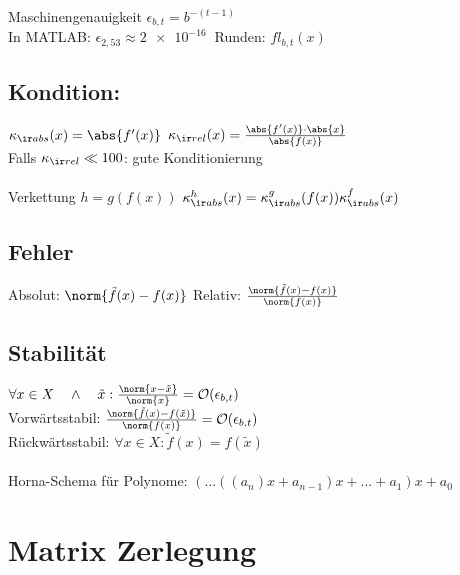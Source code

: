 \documentclass[fs, footer]{latex4ei}
\begin{document}
\begin{sectionbox}
\begin{sectionbox}
\begin{sectionbox}
	Maschinengenauigkeit $\epsilon_{b,t} = b^{-(t-1)}$\\
	In MATLAB: $\epsilon_{2,53} \approx \SI{2e-16}{}$ \qquad Runden: $fl_{b,t}(x)$\\
\end{sectionbox}

\begin{sectionbox}
	\subsection{Kondition:}
	$\kappa_{\ir abs}(x) = \abs{f'(x)}$ \qquad\qquad $\kappa_{\ir rel}(x) = \frac{\abs{f'(x)} \cdot \abs{x}}{\abs{f(x)}}$\\
	Falls $\kappa_{\ir rel} \ll 100$: gute Konditionierung\\
	\\
	Verkettung $h = g(f(x))$ \quad $\kappa^h_{\ir abs}(x) = \kappa^g_{\ir abs}(f(x))\kappa^f_{\ir abs}(x)$\\
\end{sectionbox}

\begin{sectionbox}
	\subsection{Fehler}
	Absolut: $\norm{\tilde f(x) - f(x)}$ \qquad\qquad Relativ: $\frac{\norm{\tilde f(x) - f(x)}}{\norm{f(x)}}$
\end{sectionbox}

\begin{sectionbox}
	\subsection{Stabilität}
	$\forall x \in X \quad \land \quad \tilde x:\frac{\norm{x-\tilde x}}{\norm{x}} = \mathcal O(\epsilon_{b,t})$\\
	Vorwärtsstabil:  $\frac{\norm{\tilde f(x) - f(\tilde x)}}{\norm{f(x)}} = \mathcal{O}(\epsilon_{b,t})$\\
	Rückwärtsstabil: $\forall x \in X:\tilde f(x) = f(\tilde x)$\\
	\\
	Horna-Schema für Polynome: $(...((a_n) x + a_{n-1})x + ... +a_{1})x + a_0$\\
\end{sectionbox}	

\section{Matrix Zerlegung}
\begin{sectionbox}

\end{sectionbox}
\end{sectionbox}
\end{sectionbox}
\end{document}
